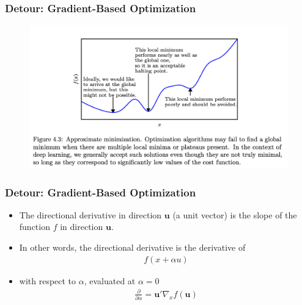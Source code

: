 \documentclass[
  shownotes,
  xcolor={svgnames},
  hyperref={colorlinks,citecolor=DarkBlue,linkcolor=DarkRed,urlcolor=DarkBlue}
  , aspectratio=169]{beamer}
\begin{document}
\begin{frame}[fragile]
\frametitle{Detour: Gradient-Based Optimization}



\begin{figure}[H] \centering
            \captionsetup{justification=centering}
              \includegraphics[scale=0.4]{figures/gradient_descent_3}
 \end{figure}
 
  \end{frame}
\begin{frame}[fragile]
\frametitle{Detour: Gradient-Based Optimization}

\begin{itemize}


\item The directional derivative in direction $\mathbf{u}$ (a unit vector) is the slope of the function $f$ in direction $\mathbf{u}$. 
\item In other words, the directional derivative is the derivative of 
\begin{align}
f(x+\alpha u)
\end{align}
\item with respect to $\alpha$, evaluated at $\alpha=0$
\begin{align}
\frac{\partial}{\partial \alpha} = \mathbf{u}'\nabla_x f(\mathbf{u}) 
\end{align}
\end{itemize}

 
  \end{frame}
\end{document}
